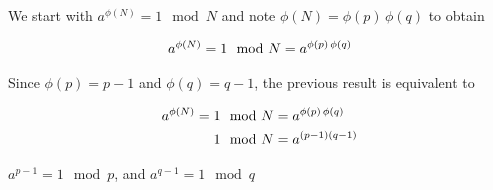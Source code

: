 \documentclass[../CryptoHW3.tex]{subfiles}
\begin{document}
\begin{flushleft}



  We start with $a^{\phi \left( N \right)} = 1 \mod N$ and note $\phi \left( N \right) = \phi \left( p \right) \, \phi \left( q \right)$ to obtain

\begin{align}
  a^{\phi \left( N \right)} = 1 \mod N = a^{\phi \left( p \right) \, \phi \left( q \right)} \notag
\end{align}
  
Since $\phi \left( p \right) = p - 1$ and $\phi \left( q \right) = q - 1$,  the previous result is equivalent to

\begin{align}
  a^{\phi \left( N \right)} = 1 \mod N &= a^{\phi \left( p \right) \, \phi \left( q \right)} \notag \\
  1 \mod N &= a^{\left(p - 1\right) \left(q - 1\right)} \notag
\end{align}






$a^{p - 1} = 1 \mod p$, and $a^{q - 1} = 1 \mod q$



























\end{flushleft}
\end{document}
